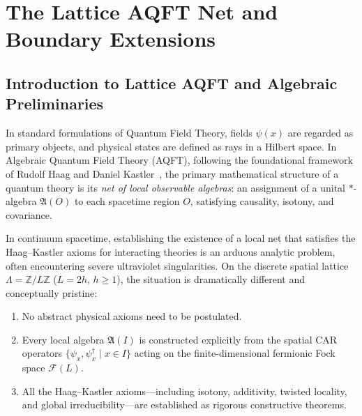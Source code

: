\chapter{The Lattice AQFT Net and Boundary Extensions}
\label{ch:lattice_aqft_net}

\section{Introduction to Lattice AQFT and Algebraic Preliminaries}

In standard formulations of Quantum Field Theory, fields $\psi(x)$ are regarded as primary objects, and physical states are defined as rays in a Hilbert space. In Algebraic Quantum Field Theory (AQFT), following the foundational framework of Rudolf Haag and Daniel Kastler~\cite{haag1996}, the primary mathematical structure of a quantum theory is its \emph{net of local observable algebras}: an assignment of a unital $*$-algebra $\mathfrak{A}(O)$ to each spacetime region $O$, satisfying causality, isotony, and covariance.

In continuum spacetime, establishing the existence of a local net that satisfies the Haag--Kastler axioms for interacting theories is an arduous analytic problem, often encountering severe ultraviolet singularities. On the discrete spatial lattice $\Lambda = \mathbb{Z}/L\mathbb{Z}$ ($L = 2h$, $h \ge 1$), the situation is dramatically different and conceptually pristine:
\begin{enumerate}
    \item No abstract physical axioms need to be postulated.
    \item Every local algebra $\mathfrak{A}(I)$ is constructed explicitly from the spatial CAR operators $\{\psi_x, \psi_x^\dagger \mid x \in I\}$ acting on the finite-dimensional fermionic Fock space $\mathcal{F}(L)$.
    \item All the Haag--Kastler axioms---including isotony, additivity, twisted locality, and global irreducibility---are established as rigorous constructive theorems.
\end{enumerate}

